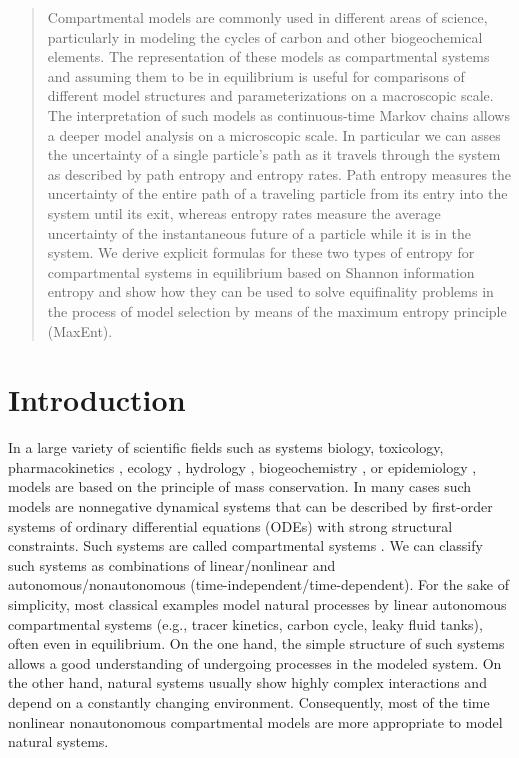 \documentclass[smallextended]{svjour3}
\newcommand{\red}[1]{\textcolor{red}{#1}}
\begin{document}
\begin{abstract}
Compartmental models are commonly used in different areas of science, particularly in modeling the cycles of carbon and other biogeochemical elements.
The representation of these models as compartmental systems and assuming them to be in equilibrium is useful for comparisons of different model structures and parameterizations on a macroscopic scale.
The interpretation of such models as continuous-time Markov chains allows a deeper model analysis on a microscopic scale.
In particular we can asses the uncertainty of a single particle's path as it travels through the system as described by path entropy and entropy rates.
Path entropy measures the uncertainty of the entire path of a traveling particle from its entry into the system until its exit, whereas entropy rates measure the average uncertainty of the instantaneous future of a particle while it is in the system.
We derive explicit formulas for these two types of entropy for compartmental systems in equilibrium based on Shannon information entropy and show how they can be used to solve equifinality problems in the process of model selection by means of the maximum entropy principle (MaxEnt).


\subclass{\red{34A30 \and 60J28 \and 60K20 \and 92B05}}
\end{abstract}

\section{Introduction}\label{intro}
In a large variety of scientific fields such as systems biology, toxicology, pharmacokinetics \citep{Anderson1983}, ecology \citep{Eriksson1971ARoEaS, Rodhe1979Tellus, Matis1979, Manzoni2009SBB}, hydrology \citep{Nash1957IASH, Botter2011GRL, Harman2014GRL}, biogeochemistry \citep{Manzoni2009SBB, Sierra2015EM}, or epidemiology \citep{Jacquez1993SIAM}, models are based on the principle of mass conservation.
In many cases such models are nonnegative dynamical systems that can be described by first-order systems of ordinary differential equations (ODEs) with strong structural constraints.
Such systems are called compartmental systems \citep{Anderson1983, Walter1999, Haddad2010}.
We can classify such systems as combinations of linear/nonlinear and autonomous/nonautonomous (time-independent/time-dependent).
For the sake of simplicity, most classical examples model natural processes by linear autonomous compartmental systems (e.g., tracer kinetics, carbon cycle, leaky fluid tanks), often even in equilibrium.
On the one hand, the simple structure of such systems allows a good understanding of undergoing processes in the modeled system. 
On the other hand, natural systems usually show highly complex interactions and depend on a constantly changing environment.
Consequently, most of the time nonlinear nonautonomous compartmental models \citep{Kloeden2013} are more appropriate to model natural systems.
\end{document}
